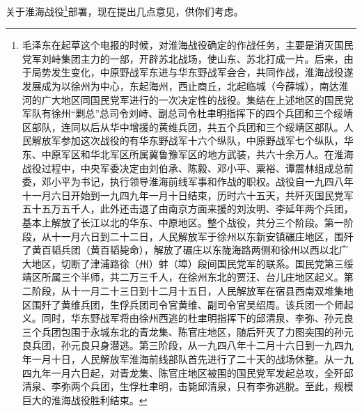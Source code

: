 \documentclass[cn,11pt,chinese]{elegantbook}
\begin{document}
关于淮海战役\footnote[1]{ 毛泽东在起草这个电报的时候，对淮海战役确定的作战任务，主要是消灭国民党军刘峙集团主力的一部，开辟苏北战场，使山东、苏北打成一片。后来，由于局势发生变化，中原野战军东进与华东野战军会合，共同作战，淮海战役遂发展成为以徐州为中心，东起海州，西止商丘，北起临城（今薛城），南达淮河的广大地区同国民党军进行的一次决定性的战役。集结在上述地区的国民党军队有徐州“剿总”总司令刘峙、副总司令杜聿明指挥下的四个兵团和三个绥靖区部队，连同以后从华中增援的黄维兵团，共五个兵团和三个绥靖区部队。人民解放军参加这次战役的有华东野战军十六个纵队，中原野战军七个纵队，华东、中原军区和华北军区所属冀鲁豫军区的地方武装，共六十余万人。在淮海战役过程中，中央军委决定由刘伯承、陈毅、邓小平、粟裕、谭震林组成总前委，邓小平为书记，执行领导淮海前线军事和作战的职权。战役自一九四八年十一月六日开始到一九四九年一月十日结束，历时六十五天，共歼灭国民党军五十五万五千人，此外还击退了由南京方面来援的刘汝明、李延年两个兵团，基本上解放了长江以北的华东、中原地区。整个战役，共分三个阶段。第一阶段，从十一月六日到二十二日，人民解放军于徐州以东新安镇碾庄地区，围歼了黄百韬兵团（黄百韬毙命），解放了碾庄以东陇海路两侧和徐州以西以北广大地区，切断了津浦路徐（州）蚌（埠）段间国民党军的联系。国民党第三绥靖区所属三个半师，共二万三千人，在徐州东北的贾汪、台儿庄地区起义。第二阶段，从十一月二十三日到十二月十五日，人民解放军在宿县西南双堆集地区围歼了黄维兵团，生俘兵团司令官黄维、副司令官吴绍周。该兵团一个师起义。同时，华东野战军将由徐州西逃的杜聿明指挥下的邱清泉、李弥、孙元良三个兵团包围于永城东北的青龙集、陈官庄地区，随后歼灭了力图突围的孙元良兵团，孙元良只身潜逃。第三阶段，从一九四八年十二月十六日到一九四九年一月十日，人民解放军淮海前线部队首先进行了二十天的战场休整。从一九四九年一月六日起，对青龙集、陈官庄地区被围的国民党军发起总攻，全歼邱清泉、李弥两个兵团，生俘杜聿明，击毙邱清泉，只有李弥逃脱。至此，规模巨大的淮海战役胜利结束。}部署，现在提出几点意见，供你们考虑。\\
\end{document}
